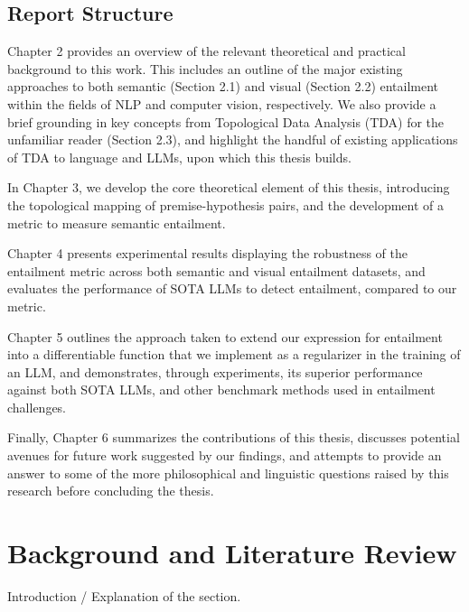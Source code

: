 \documentclass[12pt,twoside]{report}
\begin{document}
\section{Report Structure}
Chapter 2 provides an overview of the relevant theoretical and practical background to this work. This includes an outline of the major existing approaches to both semantic (Section 2.1) and visual (Section 2.2) entailment within the fields of NLP and computer vision, respectively. We also provide a brief grounding in key concepts from Topological Data Analysis (TDA) for the unfamiliar reader (Section 2.3), and highlight the handful of existing  applications of TDA to language and LLMs, upon which this thesis builds. \par   \quad In Chapter 3, we develop the core theoretical element of this thesis, introducing the topological mapping of premise-hypothesis pairs, and the development of a metric to measure semantic entailment. \par 
\quad Chapter 4 presents experimental results displaying the robustness of the entailment metric across both semantic and visual entailment datasets, and evaluates the performance of SOTA LLMs to detect entailment, compared to our metric. \par
\quad Chapter 5 outlines the approach taken to extend our expression for entailment into a differentiable function that we implement as a regularizer in the training of an LLM, and demonstrates, through experiments, its superior performance against both SOTA LLMs, and other benchmark methods used in entailment challenges. \par
\quad Finally, Chapter 6 summarizes the contributions of this thesis, discusses potential avenues for future work suggested by our findings, and attempts to provide an answer to some of the more philosophical and linguistic questions raised by this research before concluding the thesis.




\chapter{Background and Literature Review}
Introduction / Explanation of the section.
\end{document}
